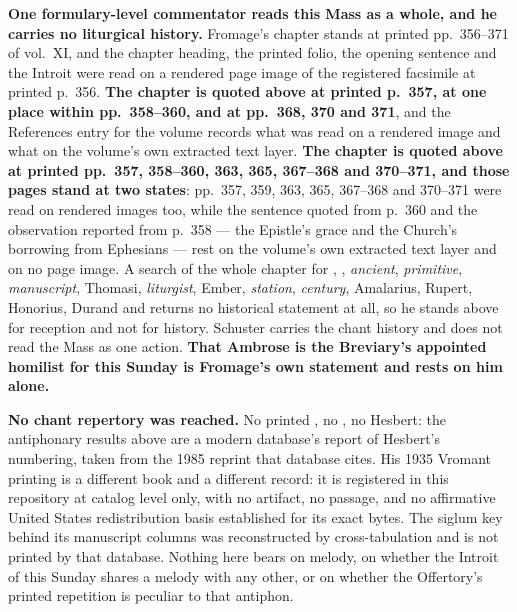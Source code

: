 \textbf{One formulary-level commentator reads this Mass as a whole, and he
carries no liturgical history.} Fromage's chapter stands at printed
pp.~356--371 of vol.~XI, and the chapter heading, the printed folio, the opening
sentence and the Introit were read on a rendered page image of the registered
facsimile at printed p.~356.%
\ifdefined\TriptychSynthesisEdition{} \textbf{The chapter is quoted above at
printed p.~357, at one place within pp.~358--360, and at pp.~368, 370 and 371},
and the References
entry for the volume records what was read on a rendered image and what on the
volume's own extracted text layer.
\else{} \textbf{The chapter is quoted above at printed
pp.~357, 358--360, 363, 365, 367--368 and 370--371, and those pages stand at two
states}: pp.~357, 359, 363, 365, 367--368 and 370--371 were read on rendered
images too, while the sentence quoted from p.~360 and the observation reported
from p.~358 --- the Epistle's grace and the Church's borrowing from Ephesians
--- rest on the volume's own extracted text layer and on no page image.
\fi
A search of the whole chapter for , ,
\emph{ancient}, \emph{primitive}, \emph{manuscript}, Thomasi, \emph{liturgist},
Ember, \emph{station}, \emph{century}, Amalarius, Rupert, Honorius, Durand and
 returns no historical statement at all, so he stands above
for reception and not for history. Schuster carries the chant history and does
not read the Mass as one action. \textbf{That Ambrose is the Breviary's
appointed homilist for this Sunday is Fromage's own statement and rests on him
alone.}

\textbf{No chant repertory was reached.} No printed , no
, no Hesbert: the antiphonary results above are a modern
database's report of Hesbert's numbering, taken from the 1985 reprint that
database cites. His 1935 Vromant printing is a different book and a different
record: it is registered in this repository at catalog level only, with no
artifact, no passage, and no affirmative United States redistribution basis
established for its exact bytes.
The siglum key behind its manuscript columns was reconstructed by
cross-tabulation and is not printed by that database. Nothing here bears on
melody, on whether the Introit of this Sunday shares a melody with any other, or
on whether the Offertory's printed repetition is peculiar to that antiphon.

